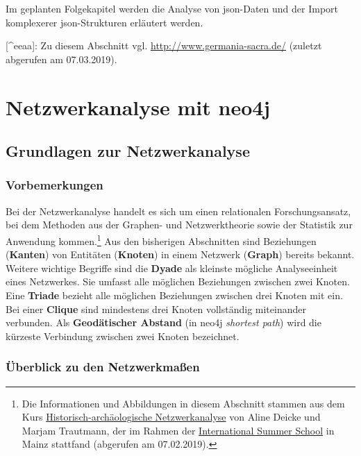 Im geplanten Folgekapitel werden die Analyse von json-Daten und der
Import komplexerer json-Strukturen erläutert werden.

{[}\^{}eeaa{]}: Zu diesem Abschnitt vgl.
\url{http://www.germania-sacra.de/} (zuletzt abgerufen am 07.03.2019).

\hypertarget{netzwerkanalyse-mit-neo4j}{%
\section{Netzwerkanalyse mit neo4j}\label{netzwerkanalyse-mit-neo4j}}

\hypertarget{grundlagen-zur-netzwerkanalyse}{%
\subsection{Grundlagen zur
Netzwerkanalyse}\label{grundlagen-zur-netzwerkanalyse}}

\hypertarget{vorbemerkungen}{%
\subsubsection{Vorbemerkungen}\label{vorbemerkungen}}

Bei der Netzwerkanalyse handelt es sich um einen relationalen
Forschungsansatz, bei dem Methoden aus der Graphen- und Netzwerktheorie
sowie der Statistik zur Anwendung kommen.\footnote{Die Informationen und
  Abbildungen in diesem Abschnitt stammen aus dem Kurs
  \href{https://digitale-methodik.adwmainz.net/mod5/5c/slides/networkAnalysis/2018/\#/step-1}{Historisch-archäologische
  Netzwerkanalyse} von Aline Deicke und Marjam Trautmann, der im Rahmen
  der \href{https://iss.adwmainz.net}{International Summer School} in
  Mainz stattfand (abgerufen am 07.02.2019).} Aus den bisherigen
Abschnitten sind Beziehungen (\textbf{Kanten}) von Entitäten
(\textbf{Knoten}) in einem Netzwerk (\textbf{Graph}) bereits bekannt.
Weitere wichtige Begriffe sind die \textbf{Dyade} als kleinste mögliche
Analyseeinheit eines Netzwerkes. Sie umfasst alle möglichen Beziehungen
zwischen zwei Knoten. Eine \textbf{Triade} bezieht alle möglichen
Beziehungen zwischen drei Knoten mit ein. Bei einer \textbf{Clique} sind
mindestens drei Knoten vollständig miteinander verbunden. Als
\textbf{Geodätischer Abstand} (in neo4j \emph{shortest path}) wird die
kürzeste Verbindung zwischen zwei Knoten bezeichnet.

\hypertarget{uxfcberblick-zu-den-netzwerkmauxdfen}{%
\subsubsection{Überblick zu den
Netzwerkmaßen}\label{uxfcberblick-zu-den-netzwerkmauxdfen}}

